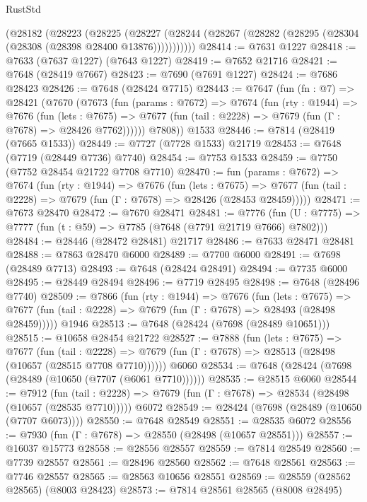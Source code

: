 \begin{lexlean}{RustStd}
\begin{coremodule}
    (@28182
      (@28223
        (@28225
          (@28227 (@28244 (@28267 (@28282 (@28295 (@28304 (@28308 (@28398 @28400 @13876)))))))))))
@28414 := @7631 @1227
@28418 := @7633 (@7637 @1227) (@7643 @1227)
@28419 := @7652 @21716
@28421 := @7648 (@28419 @7667)
@28423 := @7690 (@7691 @1227)
@28424 := @7686 @28423
@28426 := @7648 (@28424 @7715)
@28443 := @7647
    (fun (fn : @7) =>
    @28421
      (@7670
        (@7673
          (fun (params : @7672) =>
          @7674
            (fun (rty : @1944) =>
            @7676
              (fun (lets : @7675) =>
              @7677 (fun (tail : @2228) => @7679 (fun (Γ : @7678) => @28426 @7762))))))
        @7808))
    @1533
@28446 := @7814 (@28419 (@7665 @1533))
@28449 := @7727 (@7728 @1533) @21719
@28453 := @7648 (@7719 (@28449 @7736) @7740)
@28454 := @7753 @1533
@28459 := @7750 (@7752 @28454 @21722 @7708 @7710)
@28470 := fun (params : @7672) =>
  @7674
    (fun (rty : @1944) =>
    @7676
      (fun (lets : @7675) =>
      @7677 (fun (tail : @2228) => @7679 (fun (Γ : @7678) => @28426 (@28453 @28459)))))
@28471 := @7673 @28470
@28472 := @7670 @28471
@28481 := @7776
    (fun (U : @7775) => @7777 (fun (t : @59) => @7785 (@7648 (@7791 @21719 @7666) @7802)))
@28484 := @28446 (@28472 @28481) @21717
@28486 := @7633 @28471 @28481
@28488 := @7863 @28470 @6000
@28489 := @7700 @6000
@28491 := @7698 (@28489 @7713)
@28493 := @7648 (@28424 @28491)
@28494 := @7735 @6000
@28495 := @28449 @28494
@28496 := @7719 @28495
@28498 := @7648 (@28496 @7740)
@28509 := @7866
    (fun (rty : @1944) =>
    @7676
      (fun (lets : @7675) =>
      @7677 (fun (tail : @2228) => @7679 (fun (Γ : @7678) => @28493 (@28498 @28459)))))
    @1946
@28513 := @7648 (@28424 (@7698 (@28489 @10651)))
@28515 := @10658 @28454 @21722
@28527 := @7888
    (fun (lets : @7675) =>
    @7677
      (fun (tail : @2228) =>
      @7679 (fun (Γ : @7678) => @28513 (@28498 (@10657 (@28515 @7708 @7710))))))
    @6060
@28534 := @7648 (@28424 (@7698 (@28489 (@10650 (@7707 (@6061 @7710))))))
@28535 := @28515 @6060
@28544 := @7912
    (fun (tail : @2228) => @7679 (fun (Γ : @7678) => @28534 (@28498 (@10657 (@28535 @7710)))))
    @6072
@28549 := @28424 (@7698 (@28489 (@10650 (@7707 @6073))))
@28550 := @7648 @28549
@28551 := @28535 @6072
@28556 := @7930 (fun (Γ : @7678) => @28550 (@28498 (@10657 @28551)))
@28557 := @16037 @15773
@28558 := @28556 @28557
@28559 := @7814 @28549
@28560 := @7739 @28557
@28561 := @28496 @28560
@28562 := @7648 @28561
@28563 := @7746 @28557
@28565 := @28563 @10656 @28551
@28569 := @28559 (@28562 @28565) (@8003 @28423)
@28573 := @7814 @28561 @28565 (@8008 @28495)

\end{coremodule}
\end{lexlean}
